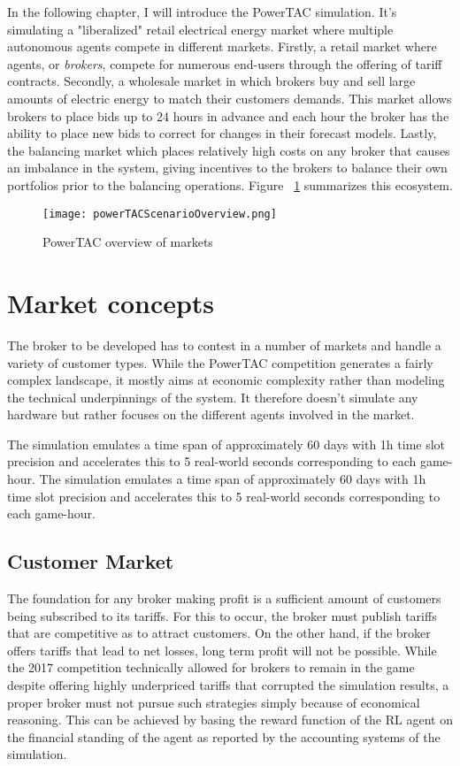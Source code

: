 In the following chapter, I will introduce the \ac{PowerTAC} simulation. It's simulating a "liberalized" retail electrical energy market where multiple autonomous agents compete in different markets. Firstly, a retail market where agents, or \emph{brokers}, compete for numerous end-users through the offering of tariff contracts. Secondly, a wholesale market in which brokers buy and sell large amounts of electric energy to match their customers demands. This market allows brokers to place bids up to 24 hours in advance and each hour the broker has the ability to place new bids to correct for changes in their forecast models. Lastly, the balancing market which places relatively high costs on any broker that causes an imbalance in the system, giving incentives to the brokers to balance their own portfolios prior to the balancing operations. Figure ~\ref{fig:powertacoverview} summarizes this ecosystem.
\begin{figure}[!h]
    \centering
    \texttt{[image: powerTACScenarioOverview.png]}
	\caption{\ac{PowerTAC} overview of markets}
    \label{fig:powertacoverview}
\end{figure}

\section{Market concepts}

The broker to be developed has to contest in a number of markets and handle a variety of customer types. While the \ac{PowerTAC} competition generates a fairly complex landscape, it mostly aims at economic complexity rather than modeling the technical underpinnings of the system. It therefore doesn't simulate any hardware but rather focuses on the different agents involved in the market.

The simulation emulates a time span of approximately 60 days with 1h time slot precision and accelerates this to 5 real-world seconds corresponding to each game-hour. The simulation emulates a time span of approximately 60 days with 1h time slot precision and accelerates this to 5 real-world seconds corresponding to each game-hour.


\subsection{Customer Market}

The foundation for any broker making profit is a sufficient amount of customers being subscribed to its tariffs. For this to occur, the broker must publish tariffs that are competitive as to attract customers. On the other hand, if the broker offers tariffs that lead to net losses, long term profit will not be possible. While the 2017 competition technically allowed for brokers to remain in the game despite offering highly underpriced tariffs that corrupted the simulation results, a proper broker must not pursue such strategies simply because of economical reasoning. %
This can be achieved by basing the reward function of the \ac{RL} agent on the financial standing of the agent as reported by the accounting systems of the simulation.  
